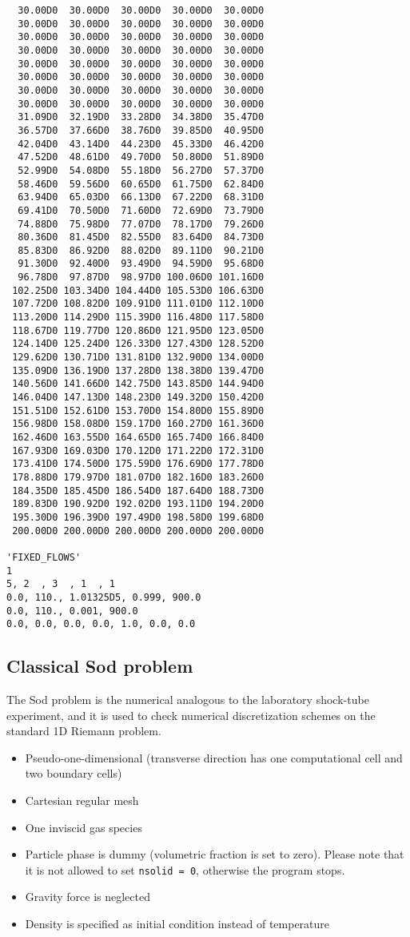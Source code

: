 \begin{verbatim}
  30.00D0  30.00D0  30.00D0  30.00D0  30.00D0
  30.00D0  30.00D0  30.00D0  30.00D0  30.00D0
  30.00D0  30.00D0  30.00D0  30.00D0  30.00D0
  30.00D0  30.00D0  30.00D0  30.00D0  30.00D0
  30.00D0  30.00D0  30.00D0  30.00D0  30.00D0
  30.00D0  30.00D0  30.00D0  30.00D0  30.00D0
  30.00D0  30.00D0  30.00D0  30.00D0  30.00D0
  30.00D0  30.00D0  30.00D0  30.00D0  30.00D0
  31.09D0  32.19D0  33.28D0  34.38D0  35.47D0
  36.57D0  37.66D0  38.76D0  39.85D0  40.95D0
  42.04D0  43.14D0  44.23D0  45.33D0  46.42D0
  47.52D0  48.61D0  49.70D0  50.80D0  51.89D0
  52.99D0  54.08D0  55.18D0  56.27D0  57.37D0
  58.46D0  59.56D0  60.65D0  61.75D0  62.84D0
  63.94D0  65.03D0  66.13D0  67.22D0  68.31D0
  69.41D0  70.50D0  71.60D0  72.69D0  73.79D0
  74.88D0  75.98D0  77.07D0  78.17D0  79.26D0
  80.36D0  81.45D0  82.55D0  83.64D0  84.73D0
  85.83D0  86.92D0  88.02D0  89.11D0  90.21D0
  91.30D0  92.40D0  93.49D0  94.59D0  95.68D0
  96.78D0  97.87D0  98.97D0 100.06D0 101.16D0
 102.25D0 103.34D0 104.44D0 105.53D0 106.63D0
 107.72D0 108.82D0 109.91D0 111.01D0 112.10D0
 113.20D0 114.29D0 115.39D0 116.48D0 117.58D0
 118.67D0 119.77D0 120.86D0 121.95D0 123.05D0
 124.14D0 125.24D0 126.33D0 127.43D0 128.52D0
 129.62D0 130.71D0 131.81D0 132.90D0 134.00D0
 135.09D0 136.19D0 137.28D0 138.38D0 139.47D0
 140.56D0 141.66D0 142.75D0 143.85D0 144.94D0
 146.04D0 147.13D0 148.23D0 149.32D0 150.42D0
 151.51D0 152.61D0 153.70D0 154.80D0 155.89D0
 156.98D0 158.08D0 159.17D0 160.27D0 161.36D0
 162.46D0 163.55D0 164.65D0 165.74D0 166.84D0
 167.93D0 169.03D0 170.12D0 171.22D0 172.31D0
 173.41D0 174.50D0 175.59D0 176.69D0 177.78D0
 178.88D0 179.97D0 181.07D0 182.16D0 183.26D0
 184.35D0 185.45D0 186.54D0 187.64D0 188.73D0
 189.83D0 190.92D0 192.02D0 193.11D0 194.20D0
 195.30D0 196.39D0 197.49D0 198.58D0 199.68D0
 200.00D0 200.00D0 200.00D0 200.00D0 200.00D0

'FIXED_FLOWS'
1
5, 2  , 3  , 1  , 1
0.0, 110., 1.01325D5, 0.999, 900.0
0.0, 110., 0.001, 900.0
0.0, 0.0, 0.0, 0.0, 1.0, 0.0, 0.0  
\end{verbatim}

\newpage
\subsection{Classical Sod problem}
The Sod problem is the numerical analogous to the laboratory shock-tube 
experiment, and it is used to check numerical discretization schemes on 
the standard 1D Riemann problem.
\begin{itemize}
\item Pseudo-one-dimensional (transverse direction has one computational cell and two boundary cells)
\item Cartesian regular mesh
\item One inviscid gas species
\item Particle phase is dummy (volumetric fraction is set to zero). Please note that
      it is not allowed to set {\tt nsolid = 0}, otherwise the program stops.
\item Gravity force is neglected
\item Density is specified as initial condition instead of temperature
\end{itemize}

